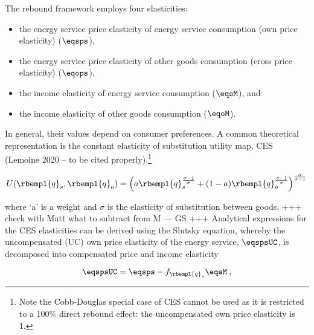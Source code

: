 

The rebound framework employs four elasticities:
%
\begin{itemize}

  \item the energy service price elasticity of energy service consumption (own price elasticity) ($\eqsps$),

  \item the energy service price elasticity of other goods consumption (cross price elasticity) ($\eqops$), 
  
  \item the income elasticity of energy service consumption ($\eqsM$), and 
  
  \item the income elasticity of other goods consumption ($\eqoM$).

\end{itemize}
%
In general, their values depend on consumer preferences.
A common theoretical representation is the constant elasticity
of substitution utility map, CES (Lemoine 2020 -- to be cited properly).\footnote{Note the Cobb-Douglas special case of CES cannot be used as it is restricted to a 100\% direct rebound effect: the uncompensated own price elasticity is 1.}

\begin{equation}
  U(\rbempl{q}_s,\rbempl{q}_o) = 
      \left( a \rbempl{q}_s^{\frac{\sigma-1}{\sigma}} + (1-a) \rbempl{q}_o^{\frac{\sigma-1}{\sigma}}\right)                ^{\frac{\sigma}{\sigma-1}}
\end{equation}

where `a' is a weight and $\sigma$ is the elasticity of substitution between goods.
+++ check with Matt what to subtract from M --- GS +++
Analytical expressions for the CES elasticities can be derived using the Slutsky equation, whereby the uncompensated (UC) own price elasticity of the energy service, $\eqspsUC$, is decomposed into compensated price and income elasticity

\begin{equation}
  \eqspsUC = \eqsps - f_{\rbempl{q}_s} \eqsM \; ,
\end{equation}
%

